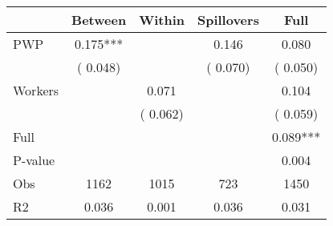 
\begin{tabular}{l*{4}{c}}\hline&\multicolumn{1}{c}{Between}&\multicolumn{1}{c}{Within}&\multicolumn{1}{c}{Spillovers}&\multicolumn{1}{c}{Full}\\ \hline
 PWP           &              0.175***      &                                               &        0.146 &         0.080                            \\ 
                               &        (       0.048)           &                                       &       (       0.070)     &      (       0.050)                                           \\ 
 Workers       &                                               &        0.071    &                                &             0.104                            \\ 
                               &                                               & (       0.062)                  &                                        &      (       0.059)                                           \\ 
\hline                                                                                                                                                                                                                                            
 Full                  &                                               &                                               &                                        &             0.089***                                     \\ 
 P-value               &                                               &                                               &                                        &             0.004                                           \\ 
 Obs                   &               1162               &       1015                       &       723                &              1450                                               \\ 
 R2                    &                      0.036              &              0.001                      &              0.036               &                     0.031                                              \\ 
\hline \end{tabular}                                                                                                                                                                                                              